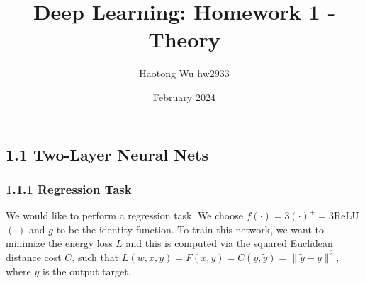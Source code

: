 \documentclass{article}
\title{Deep Learning: Homework 1 - Theory}
\author{Haotong Wu hw2933}
\date{February 2024}
\begin{document}
\maketitle

\subsection*{1.1 Two-Layer Neural Nets}

\subsubsection*{1.1.1 Regression Task}

We would like to perform a regression task. We choose $f(\cdot) = 3(\cdot)^+ = 3$ReLU$(\cdot)$ and $g$ to be the identity function. To train this network, we want to minimize the energy loss $L$ and this is computed via the squared Euclidean distance cost $C$, such that $L(w, x, y) = F(x, y) = C(y, \tilde{y}) = \|\tilde{y} - y\|^2$, where $y$ is the output target.
\end{document}
